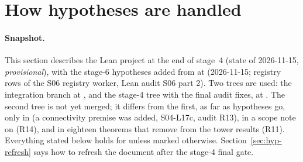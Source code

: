 
\section{How hypotheses are handled}\label{sec:hyp-intro}

\paragraph{Snapshot.}
This section describes the Lean project  at the end of stage~4
(state of 2026-11-15, \emph{provisional}), with the stage-6 hypotheses added from  at
 (2026-11-15; registry rows of the S06 registry worker, Lean audit S06 part 2). Two trees are used:
the integration branch  at , and the stage-4 tree with the final audit
fixes,  at . The second tree is not yet merged; it differs from the first, as far as
hypotheses go, only in  (a connectivity premise was added, S04-L17c, audit R13), in a scope
note on  (R14), and in eighteen  theorems that remove
 from the tower results (R11). Everything stated below holds for  unless
marked otherwise. Section~\ref{sec:hyp-refresh} says how to refresh the document after the stage-4 final gate.

